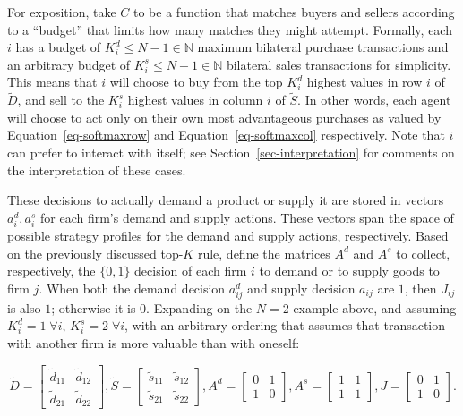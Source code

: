 \documentclass[
]{article}
\theoremstyle{plain}
\theoremstyle{definition}
\theoremstyle{remark}
\begin{document}
For exposition, take \(C\) to be a function that matches buyers and
sellers according to a ``budget'' that limits how many matches they
might attempt. Formally, each \(i\) has a budget of
\(K_i^d \leq N-1 \in \mathbb{N}\) maximum bilateral purchase
transactions and an arbitrary budget of
\(K_i^s \leq N-1 \in \mathbb{N}\) bilateral sales transactions for
simplicity. This means that \(i\) will choose to buy from the top
\(K_i^d\) highest values in row \(i\) of \(\tilde{D}\), and sell to the
\(K_i^s\) highest values in column \(i\) of \(\tilde{S}\). In other
words, each agent will choose to act only on their own most advantageous
purchases as valued by Equation~\ref{eq-softmaxrow} and
Equation~\ref{eq-softmaxcol} respectively. Note that \(i\) can prefer to
interact with itself; see Section~\ref{sec-interpretation} for comments
on the interpretation of these cases.

These decisions to actually demand a product or supply it are stored in
vectors \(a_i^d, a_i^s\) for each firm's demand and supply actions.
These vectors span the space of possible strategy profiles for the
demand and supply actions, respectively. Based on the previously
discussed top-\(K\) rule, define the matrices \(A^d\) and \(A^s\) to
collect, respectively, the \(\{0, 1\}\) decision of each firm \(i\) to
demand or to supply goods to firm \(j\). When both the demand decision
\(a_{ij}^d\) and supply decision \(a_{ij}\) are \(1\), then \(J_{ij}\)
is also \(1\); otherwise it is \(0\). Expanding on the \(N=2\) example
above, and assuming \(K_i^d=1 \; \forall i\), \(K_i^s=2 \; \forall i\),
with an arbitrary ordering that assumes that transaction with another
firm is more valuable than with oneself:

\[
\tilde{D} = 
\begin{bmatrix}
\tilde{d}_{11} & \tilde{d}_{12} \\
\tilde{d}_{21} & \tilde{d}_{22}
\end{bmatrix}
,
\tilde{S} = 
\begin{bmatrix}
\tilde{s}_{11} & \tilde{s}_{12} \\
\tilde{s}_{21} & \tilde{s}_{22}
\end{bmatrix}
,
A^d = 
\begin{bmatrix}
0 & 1 \\
1 & 0
\end{bmatrix}
,
A^s = 
\begin{bmatrix}
1 & 1 \\
1 & 1
\end{bmatrix}
,
J = 
\begin{bmatrix}
0 & 1 \\
1 & 0
\end{bmatrix}.
\]
\end{document}
